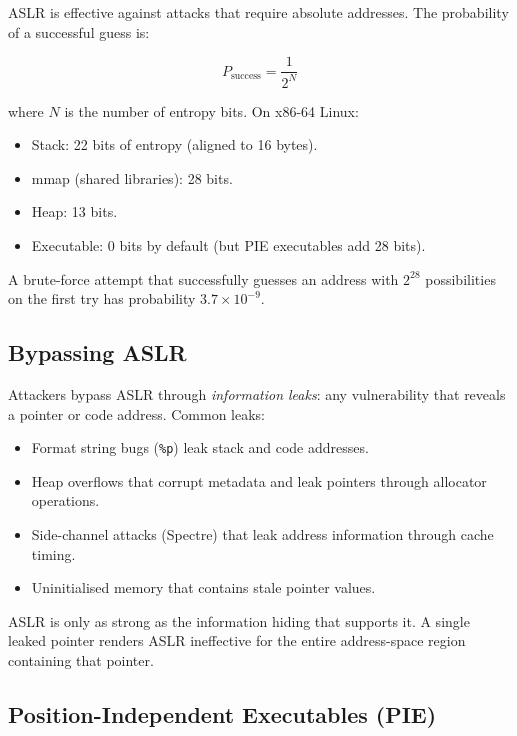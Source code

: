 ASLR is effective against attacks that require absolute addresses. The probability of a successful guess is:

\[
	P_{\text{success}} = \frac{1}{2^{N}}
\]

where \(N\) is the number of entropy bits. On x86-64 Linux:

\begin{itemize}
	\item Stack: 22 bits of entropy (aligned to 16 bytes).
	\item mmap (shared libraries): 28 bits.
	\item Heap: 13 bits.
	\item Executable: 0 bits by default (but PIE executables add 28 bits).
\end{itemize}

A brute-force attempt that successfully guesses an address with $2^{28}$ possibilities on the first try has probability $3.7\times 10^{-9}$.

\subsection{Bypassing ASLR}

Attackers bypass ASLR through \emph{information leaks}: any vulnerability that reveals a pointer or code address. Common leaks:

\begin{itemize}
	\item Format string bugs (\texttt{\%p}) leak stack and code addresses.
	\item Heap overflows that corrupt metadata and leak pointers through allocator operations.
	\item Side-channel attacks (Spectre) that leak address information through cache timing.
	\item Uninitialised memory that contains stale pointer values.
\end{itemize}

\begin{principle}[ASLR + Info Leak = No ASLR]
	ASLR is only as strong as the information hiding that supports it. A single leaked pointer renders ASLR ineffective for the entire address-space region containing that pointer.
\end{principle}

\subsection{Position-Independent Executables (PIE)}


